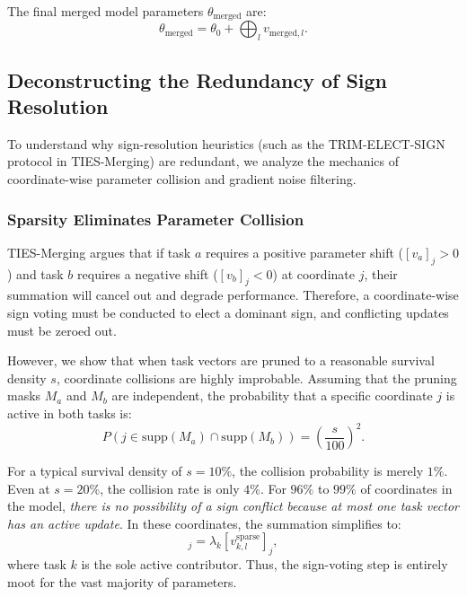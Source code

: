 The final merged model parameters $\theta_{\text{merged}}$ are:
\begin{equation}
    \theta_{\text{merged}} = \theta_0 + \bigoplus_l v_{\text{merged}, l}.
\end{equation}

\subsection{Deconstructing the Redundancy of Sign Resolution}
To understand why sign-resolution heuristics (such as the TRIM-ELECT-SIGN protocol in TIES-Merging) are redundant, we analyze the mechanics of coordinate-wise parameter collision and gradient noise filtering.

\subsubsection{Sparsity Eliminates Parameter Collision}
TIES-Merging argues that if task $a$ requires a positive parameter shift ($[v_{a}]_j > 0$) and task $b$ requires a negative shift ($[v_{b}]_j < 0$) at coordinate $j$, their summation will cancel out and degrade performance. Therefore, a coordinate-wise sign voting must be conducted to elect a dominant sign, and conflicting updates must be zeroed out.

However, we show that when task vectors are pruned to a reasonable survival density $s$, coordinate collisions are highly improbable. Assuming that the pruning masks $M_{a}$ and $M_{b}$ are independent, the probability that a specific coordinate $j$ is active in both tasks is:
\begin{equation}
    P\left(j \in \text{supp}(M_a) \cap \text{supp}(M_b)\right) = \left(\frac{s}{100}\right)^2.
\end{equation}

For a typical survival density of $s = 10\%$, the collision probability is merely $1\%$. Even at $s = 20\%$, the collision rate is only $4\%$. For $96\%$ to $99\%$ of coordinates in the model, \textit{there is no possibility of a sign conflict because at most one task vector has an active update}. In these coordinates, the summation simplifies to:
\begin{equation}
    [v_{\text{merged}, l}]_j = \lambda_k [v^{\text{sparse}}_{k, l}]_j,
\end{equation}
where task $k$ is the sole active contributor. Thus, the sign-voting step is entirely moot for the vast majority of parameters.

